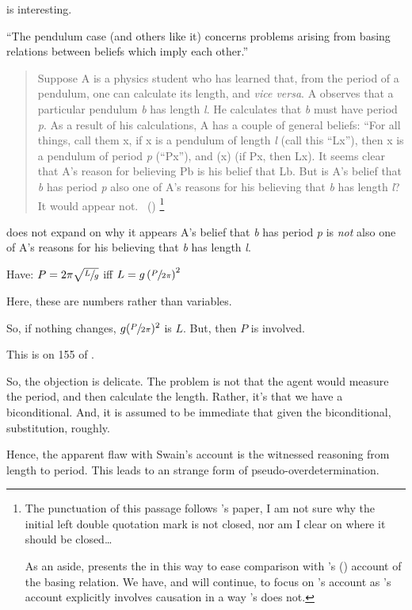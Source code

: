 \begin{note}
  \citeauthor{Tolliver:1982us} is interesting.

  ``The pendulum case (and others like it) concerns problems arising from basing relations between beliefs which imply each other.''

  \begin{quote}
    Suppose A is a physics student who has learned that, from the period of a pendulum, one can calculate its length, and \emph{vice versa}.
    A observes that a particular pendulum \emph{b} has length \emph{l}.
    He calculates that \emph{b} must have period \emph{p}.
    As a result of his calculations, A has a couple of general beliefs:
    ``For all things, call them x, if x is a pendulum of length \emph{l} (call this ``Lx''), then x is a pendulum of period \emph{p} (``Px''), and (x) (if Px, then Lx).
    It seems clear that A's reason for believing Pb is his belief that Lb.
    But is A's belief that \emph{b} has period \emph{p} also one of A's reasons for his believing that \emph{b} has length \emph{l}?
    It would appear not.\newline
    \mbox{ }\hfill\mbox{(\citeyear[152]{Tolliver:1982us})}%
    \footnote{%
      The punctuation of this passage follows \citeauthor{Tolliver:1982us}'s paper, I am not sure why the initial left double quotation mark is not closed, nor am I clear on where it should be closed\dots

      As an aside, \citeauthor{Tolliver:1982us} presents the  in this way to ease comparison with \citeauthor{Armstrong:1973vr}'s (\citeyear{Armstrong:1973vr}) account of the basing relation.
      We have, and will continue, to focus on \citeauthor{Swain:1981wd}'s account as \citeauthor{Armstrong:1973vr}'s account explicitly involves causation in a way \citeauthor{Swain:1981wd}'s does not.
    }
  \end{quote}
  \citeauthor{Tolliver:1982us} does not expand on why it appears A's belief that \emph{b} has period \emph{p} is \emph{not} also one of A's reasons for his believing that \emph{b} has length \emph{l}.
\end{note}

\begin{note}
  Have:
  \(P = 2\pi\sqrt{\sfrac{L}{g}}\) iff \(L = g \left(\sfrac{P}{2\pi}\right)^{2}\)

  Here, these are numbers rather than variables.

  So, if nothing changes, \(g(\sfrac{P}{2\pi})^{2}\) is \(L\).
  But, then \(P\) is involved.

  This is on 155 of \citeauthor{Tolliver:1982us}.

  So, the objection is delicate.
  The problem is not that the agent would measure the period, and then calculate the length.
  Rather, it's that we have a biconditional.
  And, it is assumed to be immediate that given the biconditional, substitution, roughly.

  Hence, the apparent flaw with Swain's account is the witnessed reasoning from length to period.
  This leads to an strange form of pseudo-overdetermination.
\end{note}

